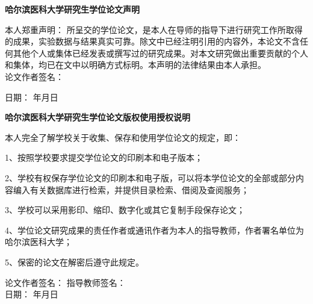


\makecover


\linespread{2}%
\clearpage
\thispagestyle{empty}
\begin{center}
	\hei\xiaosan\bfseries 哈尔滨医科大学研究生学位论文声明
\end{center}
\vspace*{0.8cm}
\song\xiaosi

本人郑重声明： 所呈交的学位论文，是本人在导师的指导下进行研究工作所取得的成果，实验数据与结果真实可靠。除文中已经注明引用的内容外，本论文不含任何其他个人或集体已经发表或撰写过的研究成果。对本文研究做出重要贡献的个人和集体，均已在文中以明确方式标明。本声明的法律结果由本人承担。\\

论文作者签名：

\hspace{6cm}	 日期：\hspace{5em} 年\hspace{2em}月\hspace{2em}日\hspace{2em}\\

\begin{center}
	\hei\xiaosan\bfseries 哈尔滨医科大学研究生学位论文版权使用授权说明
\end{center}
\vspace*{0.8cm}
\song\xiaosi

本人完全了解学校关于收集、保存和使用学位论文的规定，即：

1、按照学校要求提交学位论文的印刷本和电子版本；

2、学校有权保存学位论文的印刷本和电子版，可以将本学位论文的全部或部分内容编入有关数据库进行检索，并提供目录检索、借阅及查阅服务；

3、学校可以采用影印、缩印、数字化或其它复制手段保存论文；

4、学位论文研究成果的责任作者或通讯作者为本人的指导教师，作者署名单位为哈尔滨医科大学；

5、保密的论文在解密后遵守此规定。
\vspace*{0.8cm}

论文作者签名：\hspace{4cm} 指导教师签名：\\

\hspace{6cm}	 日期：\hspace{5em} 年\hspace{2em}月\hspace{2em}日\hspace{2em}\\
    \newpage
~\vspace{1em}
\thispagestyle{empty}